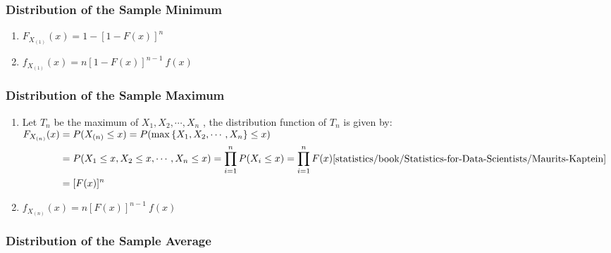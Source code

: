 \subsubsection{Distribution of the Sample Minimum}

\begin{enumerate}
    \item $F _{X_{(1)}}(x) = 1 - [1 - F(x)]^n$
    \hfill \cite{statistics/book/Statistics-for-Data-Scientists/Maurits-Kaptein}

    \item $f _{X_{(1)}} (x) = n [1 - F(x)]^{n-1}\ f (x)$
    \hfill \cite{statistics/book/Statistics-for-Data-Scientists/Maurits-Kaptein}
\end{enumerate}

\subsubsection{Distribution of the Sample Maximum}

\begin{enumerate}
    \item  Let $T_n$ be the maximum of $X_1 , X_2, \cdots , X _n$ , the distribution function of $T_n$ is given by:
    \hfill \cite{statistics/book/Statistics-for-Data-Scientists/Maurits-Kaptein}
    \\
    $
        \begin{aligned}
            F _{X_{(n)}} (x)
            &= P (X_{(n)} \leq x)
            = P (\max \dCurlyBrac{X_1, X_2, \cdots, X _n } \leq x) \\
            &= P (X_1 \leq x, X_2 \leq x, \cdots, X _n \leq x)
            = \dprod ^n _{i=1} P (X _i \leq x)
            = \dprod ^n _{i=1} F(x) \\
            &= [F (x)]^n
        \end{aligned}
        \hfill \text{\cite{statistics/book/Statistics-for-Data-Scientists/Maurits-Kaptein}}
    $

    \item $f _{X_{(n)}} (x) = n [F (x)]^{n-1}\ f (x)$
    \hfill \cite{statistics/book/Statistics-for-Data-Scientists/Maurits-Kaptein}
\end{enumerate}



\subsubsection{Distribution of the Sample Average}

